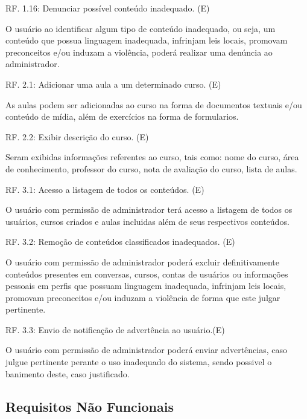 \documentclass[12pt,a4paper,onecolumn,titlepage]{article}
\begin{document}
\begin{description}
\item RF. 1.16: Denunciar possível conteúdo inadequado. (E)
\item \qquad O usuário ao identificar algum tipo de conteúdo inadequado, ou seja, um conteúdo que possua linguagem inadequada, infrinjam leis locais, promovam preconceitos e/ou induzam a violência, poderá realizar uma denúncia ao administrador.

\item RF. 2.1: Adicionar uma aula a um determinado curso. (E)
\item \qquad As aulas podem ser adicionadas ao curso na forma de documentos textuais e/ou conteúdo de mídia, além de exercícios na forma de formularios.

\item RF. 2.2: Exibir descrição do curso. (E)
\item \qquad Seram exibidas informações referentes ao curso, tais como: nome do curso, área de conhecimento, professor do curso, nota de avaliação do curso, lista de aulas.

\item RF. 3.1: Acesso a listagem de todos os conteúdos. (E)
\item \qquad O usuário com permissão de administrador terá acesso a listagem de todos os usuários, cursos criados e aulas incluidas além de seus respectivos conteúdos.

\item RF. 3.2: Remoção de conteúdos classificados inadequados. (E)
\item \qquad O usuário com permissão de administrador poderá excluir definitivamente conteúdos presentes em conversas, cursos, contas de usuários ou informações pessoais em perfis que possuam linguagem inadequada, infrinjam leis locais, promovam preconceitos e/ou induzam a violência de forma que este julgar pertinente.

\item RF. 3.3: Envio de notificação de advertência ao usuário.(E)
\item \qquad O usuário com permissão de administrador poderá enviar advertências, caso julgue pertinente perante o uso inadequado do sistema, sendo possivel o banimento deste, caso justificado.


\end{description}

\subsection{Requisitos Não Funcionais}
\end{document}
